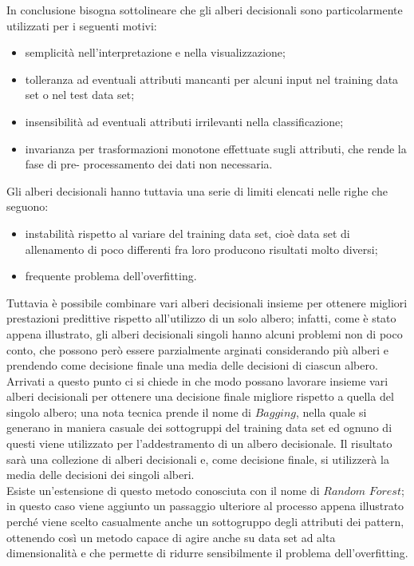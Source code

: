 In conclusione bisogna sottolineare che gli alberi decisionali sono particolarmente utilizzati per i seguenti motivi:
\begin{itemize}
	\item semplicità nell'interpretazione e nella visualizzazione;
	\item tolleranza ad eventuali attributi mancanti per alcuni input nel training data set o nel test data set;
	\item insensibilità ad eventuali attributi irrilevanti nella classificazione;
	\item invarianza per trasformazioni monotone effettuate sugli attributi, che rende la fase di pre- processamento dei dati non necessaria. 
\end{itemize}
Gli alberi decisionali hanno tuttavia una serie di limiti elencati nelle righe che seguono:
\begin{itemize}
	\item instabilità rispetto al variare del training data set, cioè data set di allenamento di poco differenti fra loro producono risultati molto diversi;
	\item frequente problema dell'overfitting.
\end{itemize}

Tuttavia è possibile combinare vari alberi decisionali insieme per ottenere migliori prestazioni predittive rispetto all'utilizzo di un solo albero; infatti, come è stato appena illustrato, gli alberi decisionali singoli hanno alcuni problemi non di poco conto, che possono però essere parzialmente arginati considerando più alberi e prendendo come decisione finale una media delle decisioni di ciascun albero.\\
Arrivati a questo punto ci si chiede in che modo possano lavorare insieme vari alberi decisionali per ottenere una decisione finale migliore rispetto a quella del singolo albero; una nota tecnica prende il nome di $\textit{Bagging}$, nella quale si generano in maniera casuale dei sottogruppi del training data set ed ognuno di questi viene utilizzato per l'addestramento di un albero decisionale. Il risultato sarà una collezione di alberi decisionali e, come decisione finale, si utilizzerà la media delle decisioni dei singoli alberi. \\
Esiste un'estensione di questo metodo conosciuta con il nome di $\textit{Random Forest}$; in questo caso viene aggiunto un passaggio ulteriore al processo appena illustrato perché viene scelto casualmente anche un sottogruppo degli attributi dei pattern, ottenendo così un metodo capace di agire anche su data set ad alta dimensionalità e che permette di ridurre sensibilmente il problema dell'overfitting.

